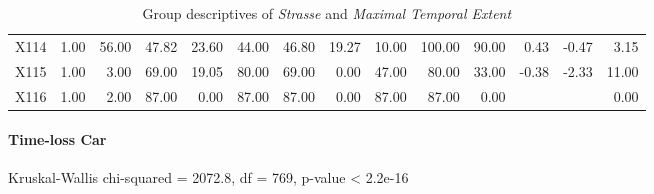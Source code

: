 \begin{table}[ht!]
\begin{tabular}{rrrrrrrrrrrrrr}
    X114 & 1.00 & 56.00 & 47.82 & 23.60 & 44.00 & 46.80 & 19.27 & 10.00 & 100.00 & 90.00 & 0.43 & -0.47 & 3.15 \\ 
    X115 & 1.00 & 3.00 & 69.00 & 19.05 & 80.00 & 69.00 & 0.00 & 47.00 & 80.00 & 33.00 & -0.38 & -2.33 & 11.00 \\ 
    X116 & 1.00 & 2.00 & 87.00 & 0.00 & 87.00 & 87.00 & 0.00 & 87.00 & 87.00 & 0.00 &  &  & 0.00 \\ 
     \hline
  \end{tabular}
	\caption{Group descriptives of \textit{Strasse} and \textit{Maximal Temporal Extent}}
	\label{tbl:descriptives_baysis_matched_Strasse_TMax}
\end{table}

\paragraph{Time-loss Car}
Kruskal-Wallis chi-squared = 2072.8, df = 769, p-value < 2.2e-16

